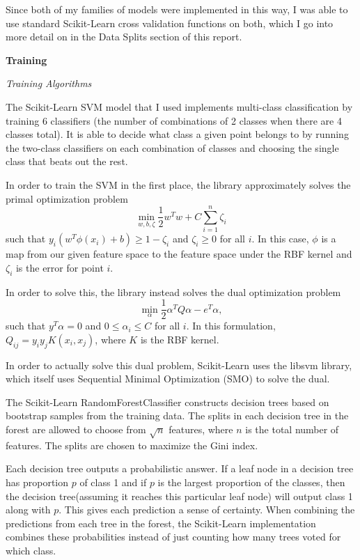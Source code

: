\documentclass{ws-ijprai}
\newcommand{\subheader}[1]{\bigskip\begin{center}\textbf{#1}\end{center}}
\newcommand{\subsubheader}[1]{\smallskip\begin{center}\textit{#1}\end{center}}
\begin{document}
Since both of my families of models were implemented in this way, I was able to use standard Scikit-Learn cross validation functions on both, which I go into more detail on in the Data Splits section of this report.


\newpage
\subheader{Training}

\subsubheader{Training Algorithms}

The Scikit-Learn SVM model that I used implements multi-class classification by training 6 classifiers (the number of combinations of 2 classes when there are 4 classes total). It is able to decide what class a given point belongs to by running the two-class classifiers on each combination of classes and choosing the single class that beats out the rest.

In order to train the SVM in the first place, the library approximately solves the primal optimization problem
\[
\min_{w,b,\zeta} \frac{1}{2} w^T w + C \sum_{i=1}^{n} \zeta_i
\] such that $y_i (w^T \phi(x_i) + b) \geq 1 - \zeta_i$ and $\zeta_i \geq 0$ for all $i$. In this case, $\phi$ is a map from our given feature space to the feature space under the RBF kernel and $\zeta_i$ is the error for point $i$.

In order to solve this, the library instead solves the dual optimization problem
\[
\min_\alpha \frac{1}{2} \alpha^T Q \alpha - e^T \alpha,
\] such that $y^T \alpha = 0$ and $0 \leq \alpha_i \leq C$ for all $i$. In this formulation, $Q_{ij} = y_i y_j K(x_i, x_j)$, where $K$ is the RBF kernel.

In order to actually solve this dual problem, Scikit-Learn uses the libsvm library, which itself uses Sequential Minimal Optimization (SMO) to solve the dual.\cite{libsvm}

The Scikit-Learn RandomForestClassifier constructs decision trees based on bootstrap samples from the training data. The splits in each decision tree in the forest are allowed to choose from $\sqrt{n}$ features, where $n$ is the total number of features. The splits are chosen to maximize the Gini index.

Each decision tree outputs a probabilistic answer. If a leaf node in a decision tree has proportion $p$ of class 1 and if $p$ is the largest proportion of the classes, then the decision tree(assuming it reaches this particular leaf node) will output class 1 along with $p$. This gives each prediction a sense of certainty. When combining the predictions from each tree in the forest, the Scikit-Learn implementation combines these probabilities instead of just counting how many trees voted for which class.
\end{document}
